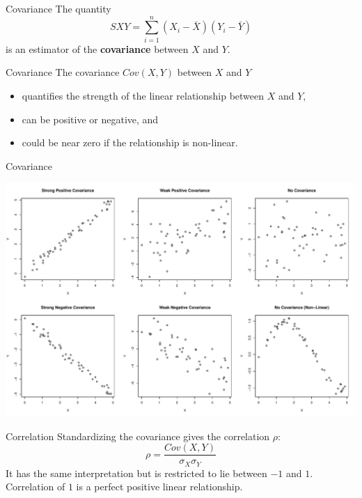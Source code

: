 \documentclass{beamer}
\begin{document}
\begin{frame}{Covariance}
    The quantity 
    \begin{equation*}
        SXY = \sum_{i=1}^n (X_i - \bar{X})(Y_i - \bar{Y})
    \end{equation*}
    is an estimator of the \textbf{covariance} between $X$ and $Y$.
\end{frame}

\begin{frame}{Covariance}
    The covariance $Cov(X, Y)$ between $X$ and $Y$ 
    \begin{itemize}
        \item quantifies the strength of the linear relationship between $X$ and $Y$,
        \item can be positive or negative, and
        \item could be near zero if the relationship is non-linear.
    \end{itemize}
\end{frame}

\begin{frame}{Covariance}
    \begin{center}
        \includegraphics[width=\linewidth]{figures/covariance.pdf}
    \end{center}
\end{frame}

\begin{frame}{Correlation}
    Standardizing the covariance gives the correlation $\rho$:
    \begin{equation*}
        \rho = \frac{Cov(X, Y)}{\sigma_X \sigma_Y}
    \end{equation*} 
    It has the same interpretation but is restricted to lie between $-1$ and $1$. Correlation of $1$ is a perfect positive linear relationship.
\end{frame}
\end{document}
